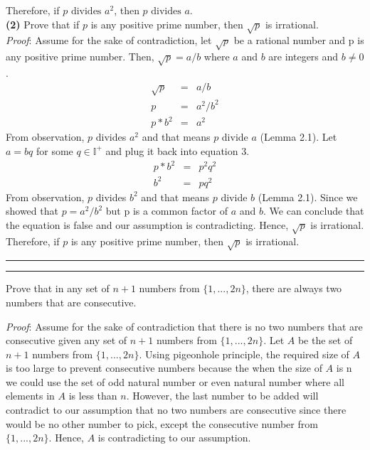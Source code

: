 \documentclass[a4paper, 11pt]{article}
\newcommand{\question}[2] {\vspace{.25in} \hrule\vspace{0.5em}
	\noindent{\bf #1: #2} \vspace{0.5em}
	\hrule \vspace{.10in}}
\renewcommand{\part}[1] {\vspace{.10in} {\bf (#1)}}
\begin{document}
	Therefore, if $p  \text{ divides } a^2$, then $p \text{ divides } a$.\\
	
	\part{2} Prove that if $p$ is any positive prime number, then $\sqrt{p}$ is irrational.\\
	
	{\em Proof}: Assume for the sake of contradiction, let $\sqrt{p}$ be a rational number and p is any positive prime number. Then, $\sqrt{p}=a/b$ where $a$ and $b$ are integers and $b \neq 0$.
	\begin{eqnarray}
	\sqrt{p}&=&a/b\\
	p&=&a^2/b^2\\
	p*b^2&=&a^2
	\end{eqnarray}
	From observation, $p$ divides $a^2$ and that means $p$ divide $a$ (Lemma 2.1).
	Let $a = bq$ for some $q \in \mathbb{I^+}$ and plug it back into equation 3.
	\begin{eqnarray}
	p*b^2&=&p^2q^2\\
	b^2&=&pq^2
	\end{eqnarray}
	From observation, $p$ divides $b^2$ and that means $p$ divide $b$ (Lemma 2.1).
	Since we showed that $	p=a^2/b^2 $ but p is a common factor of $a$ and $b$. We can
	conclude that the equation is false and our assumption is contradicting.
	Hence, $\sqrt{p}$ is irrational.
	Therefore, if $p$ is any positive prime number, then $\sqrt{p}$ is irrational.
	
	\question{3}{Spacing}
	
	Prove that in any set of $n +1$ numbers from $\{1, . . . , 2n\}$, there are always two numbers that are consecutive.
	
	{\em Proof}: Assume for the sake of contradiction that there is no two numbers that are consecutive given any set of $n +1$ numbers from $\{1, . . . , 2n\}$. Let $A$ be the set of $n +1$ numbers from $\{1, . . . , 2n\}$. Using pigeonhole principle, the required size of $A$ is too large to prevent consecutive numbers because the when the size of $A$ is n we could use the set of odd natural number or even natural number where all elements in $A$ is less than $n$. However, the last number to be added will contradict to our assumption that no two numbers are consecutive since there would be no other number to pick, except the consecutive number from $\{1, . . . , 2n\}$. Hence, $A$ is contradicting to our assumption.
	
\end{document}

